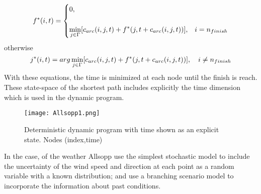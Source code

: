\begin{equation}
\label{Allsopp1eq}
f^*(i,t)=
\begin{cases}
0,  &  \\
\\
\noindent 
\displaystyle
\min_{j \in \Gamma} [ c_{arc}(i,j,t)+f^*(j,t + c_{arc}(i,j,t)) ], & i=n_{finish}\\
\end{cases}
\end{equation}
 \hspace{20mm} otherwise
\begin{equation*}
j^*(i,t)=
\noindent 
\displaystyle
arg \min_{j \in \Gamma} [ c_{arc}(i,j,t)+f^*(j,t + c_{arc}(i,j,t)) ], \quad i \neq n_{finish} 
\end{equation*}
With these equations, the time is minimized at each node until the finish is reach. These state-space of the  shortest path includes explicitly the time dimension which is used in the dynamic program.
 \begin{figure}
\centering
  \texttt{[image: Allsopp1.png]}
 \caption{Deterministic dynamic program with time shown as an explicit state. Nodes (index,time) \cite{allsopp2000optimal} }
\label{Allsopp1fig}
\end{figure}
In the case, of the weather Allsopp \cite{allsopp2000optimal} use the simplest stochastic model to include the uncertainty of the wind speed and direction at each point as a random variable with a known distribution; and use a branching scenario model to incorporate the information about past conditions. 
